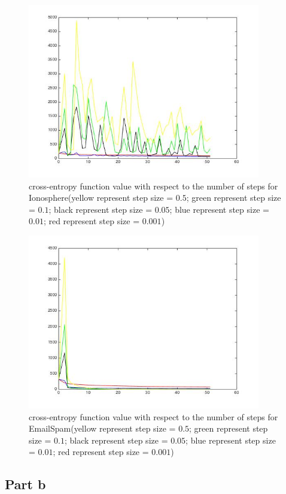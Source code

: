\documentclass[11pt]{article}
\numberwithin{equation}{section}
\begin{document}
	\begin{figure} [H]
    	\centering 
    	\includegraphics[width=4in]{Q3(a)} 
    	\caption{cross-entropy function value with respect to the number of steps for Ionosphere(yellow represent step size = $0.5$; green represent step size = $0.1$; black represent step size = $0.05$; blue represent step size = $0.01$; red represent step size = $0.001$)} 
    	\label{fig:side:a} 
	\end{figure}
	
	\begin{figure} [H]
    	\centering 
    	\includegraphics[width=4in]{Q3(a)_spam} 
    	\caption{cross-entropy function value with respect to the number of steps for EmailSpam(yellow represent step size = $0.5$; green represent step size = $0.1$; black represent step size = $0.05$; blue represent step size = $0.01$; red represent step size = $0.001$)} 
    	\label{fig:side:a} 
	\end{figure}
	
	\subsection{Part b}
	
\end{document}
